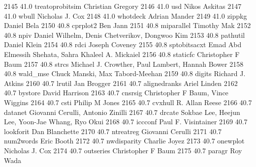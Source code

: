   2145     41.0    treatoprobitsim  Christian Gregory                       
  2146     41.0    usd           Nikos Askitas                           
  2147     41.0    wbull         Nicholas J. Cox                         
  2148     41.0    whotdeck      Adrian Mander                           
  2149     41.0    zippkg        Daniel Bela                             
  2150     40.8    cprplot2      Ben Jann                                
  2151     40.8    miparallel    Timothy Mak                             
  2152     40.8    npiv          Daniel Wilhelm, Denis Chetverikov,      
                                   Dongwoo Kim                             
  2153     40.8    pathutil      Daniel Klein                            
  2154     40.8    rdci          Joseph Coveney                          
  2155     40.8    sptobitsacxt  Emad Abd Elmessih Shehata, Sahra        
                                   Khaleel A. Mickaiel                     
  2156     40.8    staticfc      Christopher F Baum                      
  2157     40.8    strcs         Michael J. Crowther, Paul Lambert,      
                                   Hannah Bower                            
  2158     40.8    wald_mse      Chuck Manski, Max Tabord-Meehan         
  2159     40.8    digits        Richard J. Atkins                       
  2160     40.7    lrutil        Jan Brogger                             
  2161     40.7    alignedranks  Ariel Linden                            
  2162     40.7    bystore       David Harrison                          
  2163     40.7    cnsrsig       Christopher F Baum, Vince Wiggins       
  2164     40.7    csti          Philip M Jones                          
  2165     40.7    cvxhull       R. Allan Reese                          
  2166     40.7    datanet       Giovanni Cerulli, Antonio Zinilli       
  2167     40.7    drcate        Sokbae Lee, Heejun Lee, Yoon-Jae Whang, 
                                   Ryo Okui                                
  2168     40.7    iccconf       Paul F. Visintainer                     
  2169     40.7    lookforit     Dan Blanchette                          
  2170     40.7    ntreatreg     Giovanni Cerulli                        
  2171     40.7    num2words     Eric Booth                              
  2172     40.7    nwdisparity   Charlie Joyez                           
  2173     40.7    onewplot      Nicholas J. Cox                         
  2174     40.7    outseries     Christopher F Baum                      
  2175     40.7    paragr        Roy Wada                                
